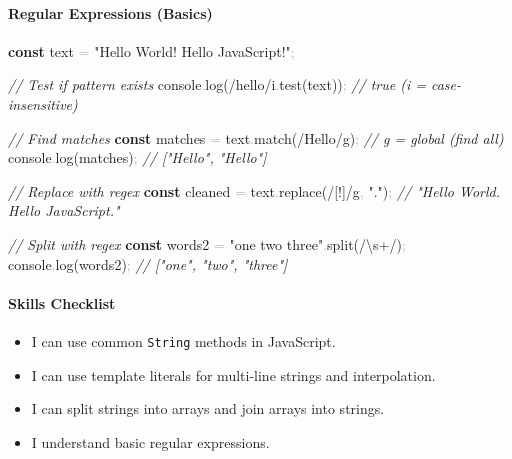 \documentclass[
  justified,
  openright,
]{tufte-book}
\let\subsection\paragraph
\let\paragraph\paragraph
\newcommand{\KeywordTok}[1]{\textcolor{CodeKeyword}{\textbf{#1}}}  %
\newcommand{\StringTok}[1]{\textcolor{CodeString}{#1}}              %
\newcommand{\CommentTok}[1]{\textcolor{CodeComment}{\textit{#1}}}  %
\newcommand{\CodeFuncTok}[1]{\textcolor{CodeKeyword}{#1}}           %
\newcommand{\OperatorTok}[1]{\textcolor{DarkGray}{#1}}              %
\newenvironment{Shaded}{%
  \begin{mdframed}[style=TufteCode]%
}{%
  \end{mdframed}%
}
\let\subsection\paragraph
\let\paragraph\paragraph
\providecommand{\tightlist}{%
  \setlength{\itemsep}{0pt}\setlength{\parskip}{0pt}}
\begin{document}
\subsection{Regular Expressions
(Basics)}\label{regular-expressions-basics}

\begin{Shaded}
\begin{Highlighting}[]
\KeywordTok{const} text \OperatorTok{=} \StringTok{"Hello World! Hello JavaScript!"}\OperatorTok{;}
 
\CommentTok{// Test if pattern exists}
console\OperatorTok{.}\CodeFuncTok{log}(\StringTok{/hello/i}\OperatorTok{.}\CodeFuncTok{test}(text))\OperatorTok{;} \CommentTok{// true (i = case{-}insensitive)}
 
\CommentTok{// Find matches}
\KeywordTok{const} matches \OperatorTok{=} text\OperatorTok{.}\CodeFuncTok{match}(\StringTok{/Hello/g})\OperatorTok{;} \CommentTok{// g = global (find all)}
console\OperatorTok{.}\CodeFuncTok{log}(matches)\OperatorTok{;} \CommentTok{// ["Hello", "Hello"]}
 
\CommentTok{// Replace with regex}
\KeywordTok{const} cleaned \OperatorTok{=} text\OperatorTok{.}\CodeFuncTok{replace}(\StringTok{/}\StringTok{[!]}\StringTok{/g}\OperatorTok{,} \StringTok{"."})\OperatorTok{;} \CommentTok{// "Hello World. Hello JavaScript."}
 
\CommentTok{// Split with regex}
\KeywordTok{const} words2 \OperatorTok{=} \StringTok{"one  two   three"}\OperatorTok{.}\CodeFuncTok{split}(\StringTok{/}\StringTok{\textbackslash{}s+}\StringTok{/})\OperatorTok{;}
console\OperatorTok{.}\CodeFuncTok{log}(words2)\OperatorTok{;} \CommentTok{// ["one", "two", "three"]}
\end{Highlighting}
\end{Shaded}

\subsection{Skills Checklist}\label{skills-checklist-62}

\begin{itemize}
\tightlist
\item[$\square$]
  I can use common \texttt{String} methods in JavaScript.
\item[$\square$]
  I can use template literals for multi-line strings and interpolation.
\item[$\square$]
  I can split strings into arrays and join arrays into strings.
\item[$\square$]
  I understand basic regular expressions.
\end{itemize}
\end{document}
